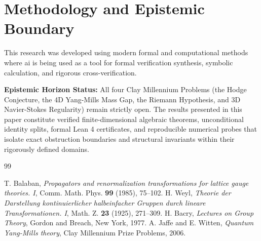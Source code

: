 \documentclass[11pt,a4paper]{article}
\theoremstyle{definition}
\begin{document}
\section{Methodology and Epistemic Boundary}
\noindent This research was developed using modern formal and computational methods where ai is being used as a tool for formal verification synthesis, symbolic calculation, and rigorous cross-verification.

\vspace{0.5em}
\noindent\textbf{Epistemic Horizon Status:} All four Clay Millennium Problems (the Hodge Conjecture, the 4D Yang-Mills Mass Gap, the Riemann Hypothesis, and 3D Navier-Stokes Regularity) remain strictly open. The results presented in this paper constitute verified finite-dimensional algebraic theorems, unconditional identity splits, formal Lean 4 certificates, and reproducible numerical probes that isolate exact obstruction boundaries and structural invariants within their rigorously defined domains.

\begin{thebibliography}{99}

 T. Balaban, \emph{Propagators and renormalization transformations for lattice gauge theories. I}, Comm. Math. Phys. \textbf{99} (1985), 75--102.
 H. Weyl, \emph{Theorie der Darstellung kontinuierlicher halbeinfacher Gruppen durch lineare Transformationen. I}, Math. Z. \textbf{23} (1925), 271--309.
 H. Bacry, \emph{Lectures on Group Theory}, Gordon and Breach, New York, 1977.
 A. Jaffe and E. Witten, \emph{Quantum Yang-Mills theory}, Clay Millennium Prize Problems, 2006.

\end{thebibliography}
\end{document}
